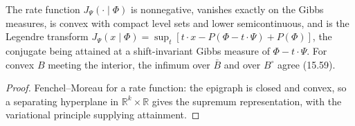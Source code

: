 \begin{proposition}
    \label{prop:ld-15-49}
    \leanok

    The rate function $J_\Psi(\cdot\mid\Phi)$ is nonnegative, vanishes exactly on the Gibbs
    measures, is convex with compact level sets and lower semicontinuous, and is the Legendre
    transform $J_\Psi(x\mid\Phi) = \sup_t [t\cdot x - P(\Phi - t\cdot\Psi) + P(\Phi)]$, the
    conjugate being attained at a shift-invariant Gibbs measure of $\Phi - t\cdot\Psi$. For convex
    $B$ meeting the interior, the infimum over $\bar B$ and over $B^\circ$ agree (15.59).
\end{proposition}
\begin{proof}
    \leanok
    Fenchel--Moreau for a rate function: the epigraph is closed and convex, so a separating
    hyperplane in $\mathbb R^k \times \mathbb R$ gives the supremum representation, with the
    variational principle supplying attainment.
\end{proof}

